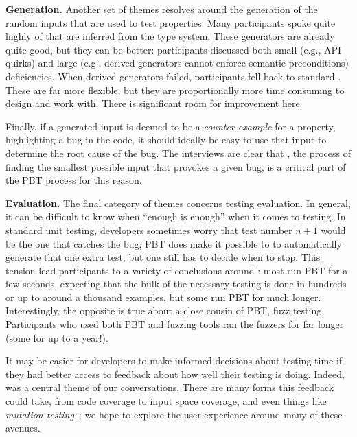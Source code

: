 {\bf Generation.} Another set of themes resolves around the generation of the
random inputs that are used to test properties. Many participants spoke quite
highly of  that are inferred from the type system.
These generators are already quite good, but they can be better: participants
discussed both small (e.g., API quirks) and large (e.g., derived generators
cannot enforce semantic preconditions) deficiencies. When derived generators
failed, participants fell back to standard . These
are far more flexible, but they are proportionally more time consuming to design
and work with. There is significant room for improvement here.

Finally, if a generated input is deemed to be a {\em counter-example} for a
property, highlighting a bug in the code, it should ideally be easy to use that
input to determine the root cause of the bug. The interviews are clear that
, the process of finding the smallest possible input that
provokes a given bug, is a critical part of the PBT process for this reason.

{\bf Evaluation.} The final category of themes concerns testing evaluation. In
general, it can be difficult to know when ``enough is enough'' when it comes to
testing. In standard unit testing, developers sometimes worry that test number
$n + 1$ would be the one that catches the bug; PBT does make it possible to to
automatically generate that one extra test, but one still has to decide when to
stop. This tension lead participants to a variety of conclusions around
: most run PBT for a few seconds, expecting
that the bulk of the necessary testing is done in hundreds or up to around a
thousand examples, but some run PBT for much longer. Interestingly, the opposite
is true about a close cousin of PBT, fuzz testing. Participants who used both
PBT and fuzzing tools ran the fuzzers for far longer (some for up to a year!).

It may be easier for developers to make informed decisions about testing time if
they had better access to feedback about how well their testing is doing.
Indeed,  was a central theme of our
conversations. There are many forms this feedback could take, from code coverage
to input space coverage, and even things like {\em mutation
testing}~\cite{papadakis_mutation_2018}; we hope to explore the user experience
around many of these avenues.


